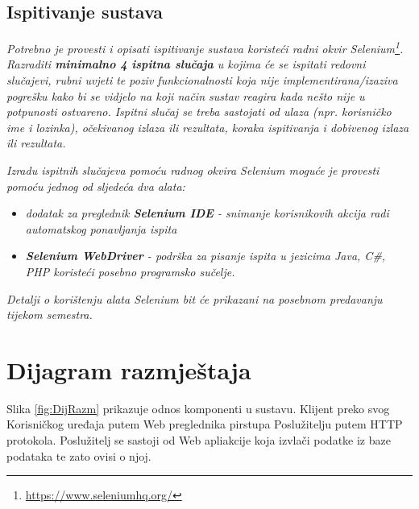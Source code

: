 			
			
			\subsection{Ispitivanje sustava}
			
			 \textit{Potrebno je provesti i opisati ispitivanje sustava koristeći radni okvir Selenium\footnote{\url{https://www.seleniumhq.org/}}. Razraditi \textbf{minimalno 4 ispitna slučaja} u kojima će se ispitati redovni slučajevi, rubni uvjeti te poziv funkcionalnosti koja nije implementirana/izaziva pogrešku kako bi se vidjelo na koji način sustav reagira kada nešto nije u potpunosti ostvareno. Ispitni slučaj se treba sastojati od ulaza (npr. korisničko ime i lozinka), očekivanog izlaza ili rezultata, koraka ispitivanja i dobivenog izlaza ili rezultata.\\ }
			 
			 \textit{Izradu ispitnih slučajeva pomoću radnog okvira Selenium moguće je provesti pomoću jednog od sljedeća dva alata:}
			 \begin{itemize}
			 	\item \textit{dodatak za preglednik \textbf{Selenium IDE} - snimanje korisnikovih akcija radi automatskog ponavljanja ispita	}
			 	\item \textit{\textbf{Selenium WebDriver} - podrška za pisanje ispita u jezicima Java, C\#, PHP koristeći posebno programsko sučelje.}
			 \end{itemize}
		 	\textit{Detalji o korištenju alata Selenium bit će prikazani na posebnom predavanju tijekom semestra.}
			
			\eject 
		
		
		\section{Dijagram razmještaja}
			
			
			 Slika \ref{fig:DijRazm} prikazuje odnos komponenti u sustavu. Klijent preko svog Korisničkog uređaja putem Web preglednika pirstupa Poslužitelju putem HTTP protokola. Poslužitelj se sastoji od Web apliakcije koja izvlači podatke iz baze podataka te zato ovisi o njoj.
			 

